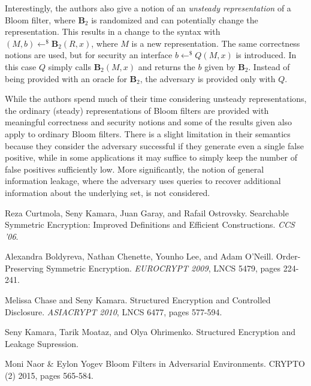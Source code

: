 \documentclass[11pt, pdftex]{article}
\begin{document}
Interestingly, the authors also give a notion of an {\em unsteady representation} of a Bloom filter, where $\mathbf{B}_2$ is randomized and can potentially change the representation. This results in a change to the syntax with $(M,b) \gets^\$ \mathbf{B}_2(R,x)$, where $M$ is a new representation. The same correctness notions are used, but for security an interface $b \gets^\$ Q(M,x)$ is introduced. In this case $Q$ simply calls $\mathbf{B}_2(M,x)$ and returns the $b$ given by $\mathbf{B}_2$. Instead of being provided with an oracle for $\mathbf{B}_2$, the adversary is provided only with $Q$.

While the authors spend much of their time considering unsteady representations, the ordinary (steady) representations of Bloom filters are provided with meaningful correctness and security notions and some of the results given also apply to ordinary Bloom filters. There is a slight limitation in their semantics because they consider the adversary successful if they generate even a single false positive, while in some applications it may suffice to simply keep the number of false positives sufficiently low. More significantly, the notion of general information leakage, where the adversary uses queries to recover additional information about the underlying set, is not considered.

\begin{thebibliography}{9}
Reza Curtmola, Seny Kamara, Juan Garay, and Rafail Ostrovsky.
Searchable Symmetric Encryption: Improved Definitions and Efficient Constructions.
\textit{CCS '06}.

Alexandra Boldyreva, Nathan Chenette, Younho Lee, and Adam O'Neill.
Order-Preserving Symmetric Encryption.
\textit{EUROCRYPT 2009}, LNCS 5479, pages 224-241.

Melissa Chase and Seny Kamara.
Structured Encryption and Controlled Disclosure.
\textit{ASIACRYPT 2010}, LNCS 6477, pages 577-594.

Seny Kamara, Tarik Moataz, and Olya Ohrimenko.
Structured Encryption and Leakage Supression.

Moni Naor \& Eylon Yogev
Bloom Filters in Adversarial Environments.
CRYPTO (2) 2015, pages 565-584.
\end{thebibliography}
\end{document}
